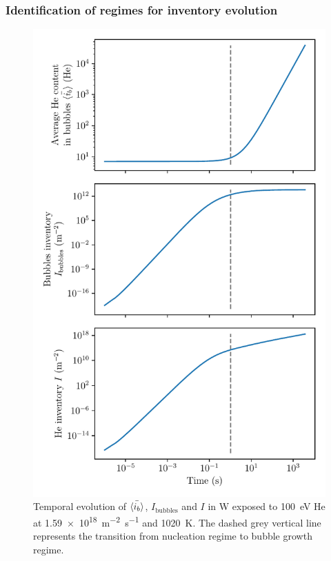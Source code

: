 \subsubsection{Identification of regimes for inventory evolution} \label{nucleation growth phases}

\begin{figure} [h]
    \centering
    \includegraphics[width=\linewidth]{Figures/Chapter4/parametric study/inventory_bubbles_ib.pdf}
    \caption{Temporal evolution of $\Bar{\langle i_b \rangle}$, $I_\mathrm{bubbles}$ and $I$ in W exposed to \SI{100}{eV} He at \SI{1.59e18}{m^{-2}.s^{-1}} and \SI{1020}{K}. The dashed grey vertical line represents the transition from nucleation regime to bubble growth regime.}
    \label{fig:two regimes}
\end{figure}

